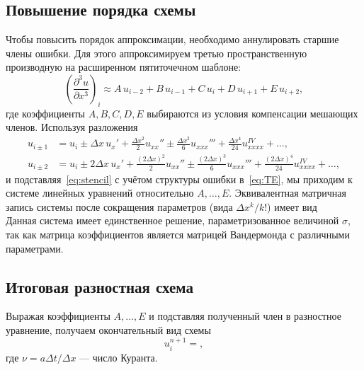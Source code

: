 \documentclass[12pt]{article}
\begin{document}
\subsection{Повышение порядка схемы}
Чтобы повысить порядок аппроксимации, необходимо аннулировать старшие члены ошибки. Для этого аппроксимируем третью пространственную производную на расширенном пятиточечном шаблоне:
\begin{equation}
\left(\frac{\partial^3 u}{\partial x^3}\right)_i
\approx A\,u_{i-2} + B\,u_{i-1} + C\,u_i + D\,u_{i+1} + E\,u_{i+2},
\label{eq:stencil}
\end{equation}
где коэффициенты $A,B,C,D,E$ выбираются из условия компенсации мешающих членов. Используя разложения
\begin{equation}
\begin{aligned}
u_{i\pm1} &= u_i \pm \Delta x\,u_x' + \frac{\Delta x^2}{2}u_{xx}'' \pm \frac{\Delta x^3}{6}u_{xxx}''' + \frac{\Delta x^4}{24}u_{xxxx}^{IV} + \dots,\\
u_{i\pm2} &= u_i \pm 2\Delta x\,u_x' + \frac{(2\Delta x)^2}{2}u_{xx}'' \pm \frac{(2\Delta x)^3}{6}u_{xxx}''' + \frac{(2\Delta x)^4}{24}u_{xxxx}^{IV} + \dots,
\end{aligned}
\end{equation}
и подставляя~\eqref{eq:stencil} с учётом структуры ошибки в~\eqref{eq:TE}, мы приходим к системе линейных уравнений относительно $A,\dots,E$. Эквивалентная матричная запись системы после сокращения параметров (вида $\Delta x^k/k!$) имеет вид
\begin{equation}

\label{eq:taylor-coefficients-system}
\end{equation}
Данная система имеет единственное решение, параметризованное величиной $\sigma$, так как матрица коэффициентов является матрицей Вандермонда с различными параметрами.

\subsection{Итоговая разностная схема}
Выражая коэффициенты $A,\dots,E$ и подставляя полученный член в разностное уравнение, получаем окончательный вид схемы
\begin{dmath}
u_i^{n+1} =
,
\label{eq:scheme-cfl-form-stencil-form}
\end{dmath}
где $\nu = a\Delta t/\Delta x$ — число Куранта.  
\end{document}
